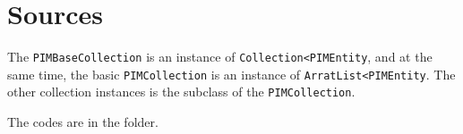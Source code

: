 \documentclass{article}
\begin{document}
\section{Sources}
\label{sec:source}

The \lstinline|PIMBaseCollection| is an instance of \lstinline|Collection<PIMEntity|,
and at the same time, the basic \lstinline|PIMCollection| is an instance of \lstinline|ArratList<PIMEntity|.
The other collection instances is the subclass of the \lstinline|PIMCollection|.

The codes are in the folder.
\end{document}

